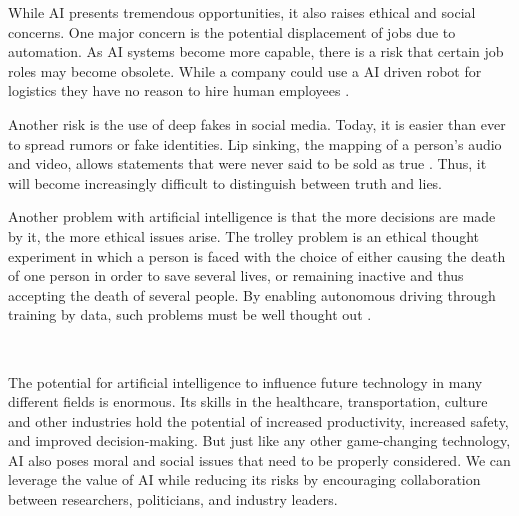 \documentclass{article}
\begin{document}
While AI presents tremendous opportunities, it also raises ethical and social concerns. One major concern is the potential displacement of jobs due to automation. As AI systems become more capable, there is a risk that certain job roles may become obsolete. While a company could use a AI driven robot for logistics they have no reason to hire human employees \cite{10}. \par 
Another risk is the use of deep fakes in social media. Today, it is easier than ever to spread rumors or fake identities. Lip sinking, the mapping of a person's audio and video, allows statements that were never said to be sold as true \cite{12}. Thus, it will become increasingly difficult to distinguish between truth and lies. \par 
Another problem with artificial intelligence is that the more decisions are made by it, the more ethical issues arise. The trolley problem is an ethical thought experiment in which a person is faced with the choice of either causing the death of one person in order to save several lives, or remaining inactive and thus accepting the death of several people. By enabling autonomous driving through training by data, such problems must be well thought out \cite{13}. \par \ \par

The potential for artificial intelligence to influence future technology in many different fields is enormous. Its skills in the healthcare, transportation, culture and other industries hold the potential of increased productivity, increased safety, and improved decision-making. But just like any other game-changing technology, AI also poses moral and social issues that need to be properly considered. We can leverage the value of AI while reducing its risks by encouraging collaboration between researchers, politicians, and industry leaders.

\newpage
\end{document}
